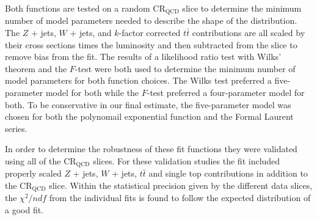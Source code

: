 Both functions are tested on a random $\text{CR}_{\text{QCD}}$ slice to
determine the minimum number of model parameters needed to describe the shape
of the distribution.  The $Z$ + jets, $W$ + jets, and
$k$-factor corrected $t\bar{t}$ contributions are all scaled
by their cross sections times the luminosity and then subtracted from the slice
to remove bias from the fit.  The results of a likelihood ratio test with
Wilks' theorem \cite{wilks1938} and the $F$-test
\cite{snecdecor1991statistical} were both used to determine the minimum number
of model parameters for both function choices.  The Wilks test preferred a
five-parameter model for both while the $F$-test preferred a four-parameter
model for both.  To be conservative in our final estimate, the five-parameter
model was chosen for both the polynomail exponential function and the Formal
Laurent series.

In order to determine the robustness of these fit functions they were validated
using all of the $\text{CR}_{\text{QCD}}$ slices.  For these validation studies
the fit included properly scaled $Z$ + jets, $W$ + jets, $t\bar{t}$ and single
top contributions in addition to the $\text{CR}_{\text{QCD}}$ slice. Within the
statistical precision given by the different data slices, the $\chi^{2}/ndf$
from the individual fits is found to follow the expected distribution of a good
fit.
